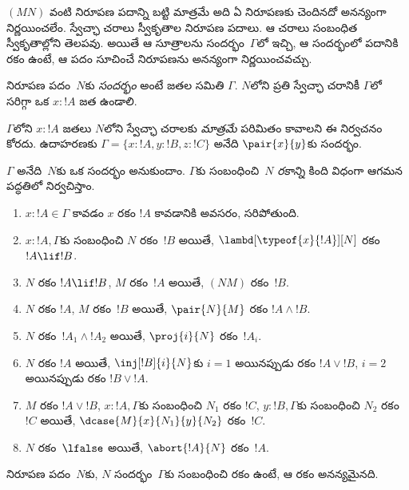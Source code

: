 \documentclass[../../../include/open-logic-section]{subfiles}
\begin{document}


$(MN)$ వంటి నిరూపణ పదాన్ని బట్టి మాత్రమే అది ఏ నిరూపణకు చెందినదో అనన్యంగా నిర్ణయించలేం. స్వేచ్ఛా చరాలు స్వీకృతాల నిరూపణ పదాలు. ఆ చరాలు సంబంధిత స్వీకృతాల్లోని  తెలపవు. అయితే ఆ సూత్రాలను సందర్భం~$\Gamma$లో ఇచ్చి, ఆ సందర్భంలో పదానికి రకం ఉంటే, ఆ పదం సూచించే నిరూపణను అనన్యంగా నిర్ణయించవచ్చు.

\begin{defn}
నిరూపణ పదం~$N$కు \emph{సందర్భం} అంటే జతల సమితి $\Gamma$. $N$లోని ప్రతి స్వేచ్ఛా చరానికీ $\Gamma$లో సరిగ్గా ఒక $x : !A$ జత ఉండాలి.
\end{defn}

$\Gamma$లోని $x:!A$ జతలు $N$లోని స్వేచ్ఛా చరాలకు \emph{మాత్రమే} పరిమితం కావాలని ఈ నిర్వచనం కోరదు. ఉదాహరణకు $\Gamma =
\{x:!A, y:!B, z:!C\}$ అనేది $\pair{x}{y}$కు సందర్భం.

\begin{defn}
  $\Gamma$ అనేది~$N$కు ఒక సందర్భం అనుకుందాం. $\Gamma$కు సంబంధించి~$N$ \emph{రకాన్ని} కింది విధంగా ఆగమన పద్ధతిలో నిర్వచిస్తాం.
  \begin{enumerate}
  \item $x:!A \in \Gamma$ కావడం $x$ రకం $!A$ కావడానికి అవసరం, సరిపోతుంది.
  \item $x:!A, \Gamma$కు సంబంధించి $N$ రకం~$!B$ అయితే, $\lambd[\typeof{x}{!A}][N]$ రకం $!A \lif !B$.
  \item $N$ రకం $!A \lif !B$, $M$ రకం~$!A$ అయితే, $(NM)$ రకం~$!B$.
  \item $N$ రకం $!A$, $M$ రకం~$!B$ అయితే, $\pair{N}{M}$ రకం $!A \land !B$.
  \item $N$ రకం~$!A_1 \land !A_2$ అయితే, $\proj{i}{N}$ రకం~$!A_i$.
  \item $N$ రకం $!A$ అయితే, $\inj[!B]{i}{N}$కు $i=1$ అయినప్పుడు రకం $!A \lor !B$, $i=2$ అయినప్పుడు రకం $!B \lor
    !A$.
  \item $M$ రకం $!A \lor !B$, $x:!A, \Gamma$కు సంబంధించి $N_1$ రకం $!C$, $y:!B,
  \Gamma$కు సంబంధించి $N_2$ రకం~$!C$ అయితే, $\dcase{M}{x}{N_1}{y}{N_2}$ రకం~$!C$.
  \item $N$ రకం~$\lfalse$ అయితే, $\abort{!A}{N}$ రకం~$!A$.
  \end{enumerate}
\end{defn}

\begin{prop}
నిరూపణ పదం~$N$కు, $N$ సందర్భం~$\Gamma$కు సంబంధించి రకం ఉంటే, ఆ రకం అనన్యమైనది.
\end{prop}
\end{document}

